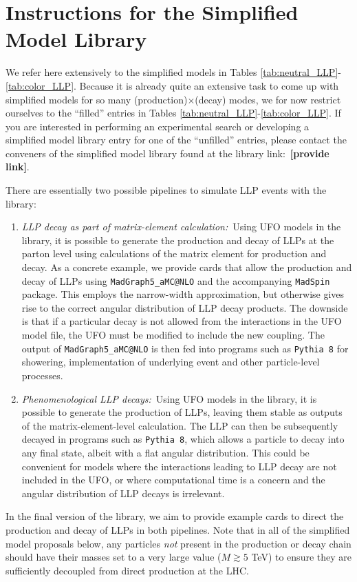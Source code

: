 

\section{Instructions for the Simplified Model Library}

We refer here extensively to the simplified models in Tables  \ref{tab:neutral_LLP}-\ref{tab:color_LLP}. Because it is already quite an extensive task to come up with simplified models for so many (production)$\times$(decay) modes, we for now restrict ourselves to the ``filled'' entries in Tables  \ref{tab:neutral_LLP}-\ref{tab:color_LLP}. If you are interested in performing an experimental search or developing a simplified model library entry for one of the ``unfilled'' entries, please contact the conveners of the simplified model library found at the library link:~{\bf [provide link]}.

There are essentially two possible pipelines to simulate LLP events with the library:
%
\begin{enumerate}

\item \emph{LLP decay as part of matrix-element calculation:}~Using UFO models in the library, it is possible to generate the production and decay of LLPs at the parton level using calculations of the matrix element for production and decay. As a concrete example, we provide cards that allow the production and decay of LLPs using \texttt{MadGraph5\_aMC@}\texttt{NLO} \cite{Alwall:2014hca} and the accompanying  \texttt{MadSpin} \cite{Artoisenet:2012st} package. This employs the narrow-width approximation, but otherwise gives rise to the correct angular distribution of LLP decay products. The downside is that if a particular decay is not allowed from the interactions in the UFO model file, the UFO must be modified to include the new coupling. The output of \texttt{MadGraph5\_aMC@}\texttt{NLO} is then fed into programs such as \texttt{Pythia 8} \cite{Sjostrand:2007gs,Sjostrand:2014zea} for showering, implementation of underlying event and other particle-level processes.

\item \emph{Phenomenological LLP decays:}~Using UFO models in the library, it is possible to generate the production of LLPs, leaving them stable as outputs of the matrix-element-level calculation. The LLP can then be subsequently decayed in programs such as \texttt{Pythia 8}, which allows a particle to decay into any final state, albeit with a flat angular distribution. This could be convenient for models where the interactions leading to LLP decay are not included in the UFO, or where computational time is a concern and the angular distribution of LLP decays is irrelevant.

\end{enumerate}
%
In the final version of the library, we aim to provide example cards to direct the production and decay of LLPs in both pipelines. Note that in all of the simplified model proposals below, any particles \emph{not} present in the production or decay chain should have their masses set to a very large value ($M\gtrsim5$ TeV) to ensure they are sufficiently decoupled from direct production at the LHC.


